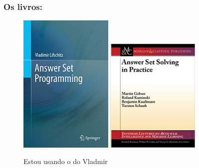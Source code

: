 \documentclass{beamer}
\begin{document}
\begin{frame}
	\frametitle{Os livros:}
	
\begin{figure}[tbp]
  \centering
	 \includegraphics[width=0.4\textwidth , height=0.55\textheight]{cover_book_vladmir.jpg}
	 \includegraphics[width=0.4\textwidth , height=0.55\textheight]{cover_book_roland.jpg}
  \caption{Estou usando o do Vladmir}
	
	\end{figure}
\end{frame}
\end{document}
